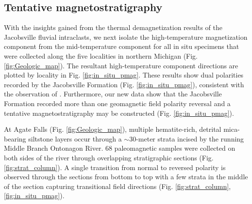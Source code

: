 \documentclass[draft]{agujournal2019}
\begin{document}
\subsection*{Tentative magnetostratigraphy}

With the insights gained from the thermal demagnetization results of the Jacobsville fluvial intraclasts, we next isolate the high-temperature magnetization component from the mid-temperature component for all in situ specimens that were collected along the five localities in northern Michigan (Fig. \ref{fig:Geologic_map}). The resultant high-temperature component directions are plotted by locality in Fig. \ref{fig:in_situ_pmag}. These results show dual polarities recorded by the Jacobsville Formation (Fig. \ref{fig:in_situ_pmag}), consistent with the observation of . Furthermore, our new data show that the Jacobsville Formation recorded more than one geomagnetic field polarity reversal and a tentative magnetostratigraphy may be constructed (Fig. \ref{fig:in_situ_pmag}). 

At Agate Falls (Fig. \ref{fig:Geologic_map}), multiple hematite-rich, detrital mica-bearing siltstone layers occur through a $\sim$30-meter strata incised by the running Middle Branch Ontonagon River. 68 paleomagnetic samples were collected on both sides of the river through overlapping stratigraphic sections (Fig. \ref{fig:strat_column}). A single transition from normal to reversed polarity is observed through the sections from bottom to top with a few strata in the middle of the section capturing transitional field directions (Fig. \ref{fig:strat_column}, \ref{fig:in_situ_pmag}). 
\end{document}
